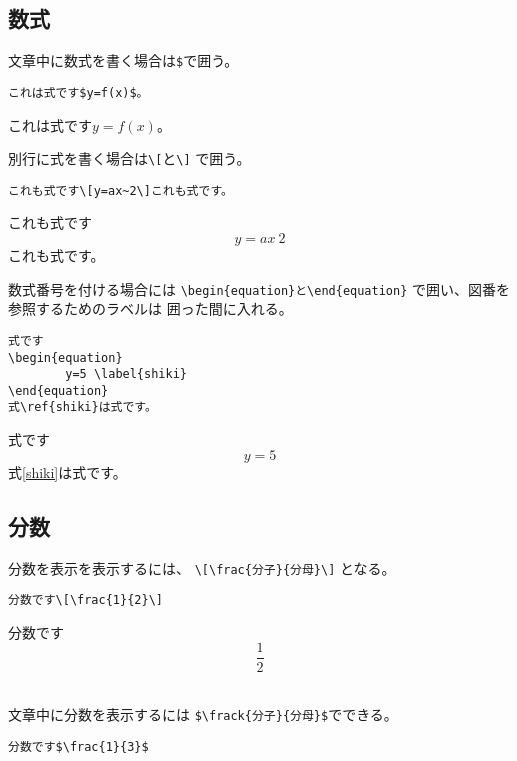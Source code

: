 \documentclass{jsarticle}
\begin{document}
\subsection{数式}
文章中に数式を書く場合は\verb|$|で囲う。\\

\begin{verbatim}
これは式です$y=f(x)$。
\end{verbatim}

これは式です$y=f(x)$。\\
\par
別行に式を書く場合は\verb|\[|と\verb|\]|
で囲う。\\

\begin{verbatim}
これも式です\[y=ax~2\]これも式です。
\end{verbatim}

これも式です\[y=ax~2\]これも式です。\\
\par
数式番号を付ける場合には
\verb|\begin{equation}と\end{equation}|
で囲い、図番を参照するためのラベルは
囲った間に入れる。

\begin{verbatim}
式です
\begin{equation}
		y=5 \label{shiki}
\end{equation}
式\ref{shiki}は式です。
\end{verbatim}

式です
\begin{equation}
		y=5 \label{shiki}
\end{equation}
式\ref{shiki}は式です。\\

\subsection{分数}
分数を表示を表示するには、
\verb|\[\frac{分子}{分母}\]|
となる。

\begin{verbatim}
分数です\[\frac{1}{2}\]
\end{verbatim}

分数です\[\frac{1}{2}\]\\
\par
文章中に分数を表示するには
\verb|$\frack{分子}{分母}$|でできる。

\begin{verbatim}
分数です$\frac{1}{3}$
\end{verbatim}
\end{document}
